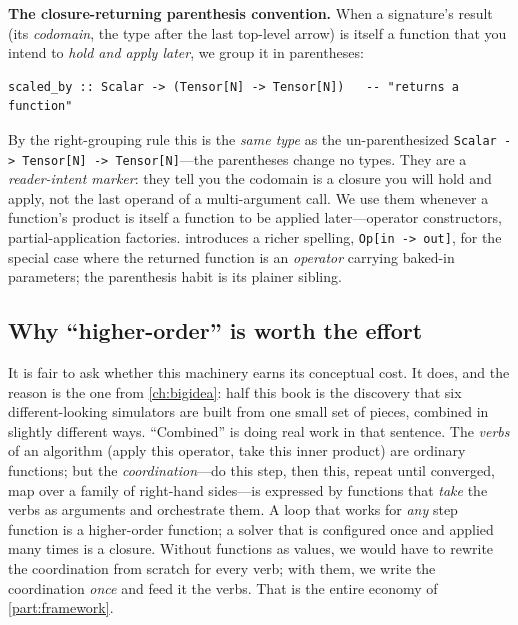 \begin{notationbox}
\textbf{The closure-returning parenthesis convention.} When a signature's result
(its \emph{codomain}, the type after the last top-level arrow) is itself a
function that you intend to \emph{hold and apply later}, we group it in
parentheses:
\begin{lstlisting}[style=l4style]
scaled_by :: Scalar -> (Tensor[N] -> Tensor[N])   -- "returns a function"
\end{lstlisting}
By the right-grouping rule this is the \emph{same type} as the un-parenthesized
\lstinline[style=l4style]|Scalar -> Tensor[N] -> Tensor[N]|---the parentheses
change no types. They are a \emph{reader-intent marker}: they tell you the
codomain is a closure you will hold and apply, not the last operand of a
multi-argument call. We use them whenever a function's product is itself a
function to be applied later---operator constructors, partial-application
factories.  introduces a richer spelling,
\lstinline[style=l4style]|Op[in -> out]|, for the special case where the returned
function is an \emph{operator} carrying baked-in parameters; the parenthesis habit
is its plainer sibling.
\end{notationbox}

\subsection{Why ``higher-order'' is worth the effort}

It is fair to ask whether this machinery earns its conceptual cost. It does, and
the reason is the one from \cref{ch:bigidea}: half this book is the discovery
that six different-looking simulators are built from one small set of pieces,
combined in slightly different ways. ``Combined'' is doing real work in that
sentence. The \emph{verbs} of an algorithm (apply this operator, take this inner
product) are ordinary functions; but the \emph{coordination}---do this step, then
this, repeat until converged, map over a family of right-hand sides---is expressed
by functions that \emph{take} the verbs as arguments and orchestrate them. A loop
that works for \emph{any} step function is a higher-order function; a solver that
is configured once and applied many times is a closure. Without functions as
values, we would have to rewrite the coordination from scratch for every verb;
with them, we write the coordination \emph{once} and feed it the verbs. That is
the entire economy of \cref{part:framework}.

